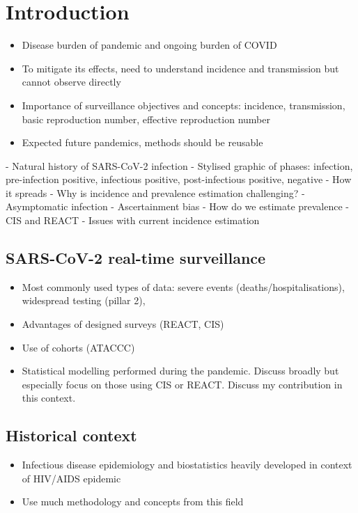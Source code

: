 \documentclass[thesis.tex]{subfiles}
\begin{document}
\chapter{Introduction} \label{intro}

\begin{itemize}
    \item Disease burden of pandemic and ongoing burden of COVID
    \item To mitigate its effects, need to understand incidence and transmission but cannot observe directly
    \item Importance of surveillance objectives and concepts: incidence, transmission, basic reproduction number, effective reproduction number
    \item Expected future pandemics, methods should be reusable
\end{itemize}

- Natural history of SARS-CoV-2 infection
	- Stylised graphic of phases: infection, pre-infection positive, infectious positive, post-infectious positive, negative
	- How it spreads
- Why is incidence and prevalence estimation challenging?
	- Asymptomatic infection
	- Ascertainment bias
- How do we estimate prevalence
	- CIS and REACT
- Issues with current incidence estimation

\section{SARS-CoV-2 real-time surveillance}

\begin{itemize}
    \item Most commonly used types of data: severe events (deaths/hospitalisations), widespread testing (pillar 2), 
    \item Advantages of designed surveys (REACT, CIS)
    \item Use of cohorts (ATACCC)
    \item Statistical modelling performed during the pandemic. Discuss broadly but especially focus on those using CIS or REACT. Discuss my contribution in this context.
\end{itemize}


\section{Historical context}

\begin{itemize}
    \item Infectious disease epidemiology and biostatistics heavily developed in context of HIV/AIDS epidemic
    \item Use much methodology and concepts from this field
\end{itemize}
\end{document}
